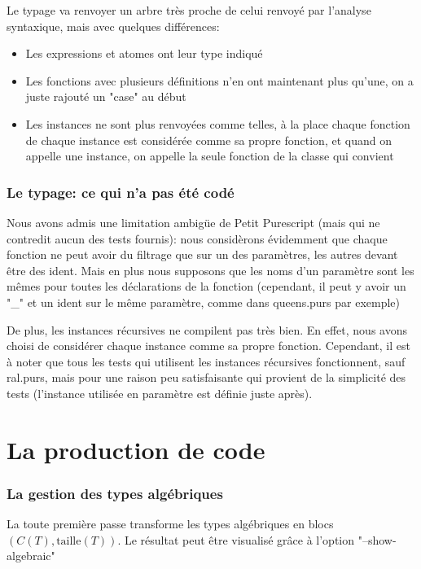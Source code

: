 \documentclass[12pt,a4paper,french]{article}
\begin{document}
Le typage va renvoyer un arbre très proche de celui renvoyé par l'analyse syntaxique, mais avec quelques différences:

\begin{itemize}
	\item Les expressions et atomes ont leur type indiqué
	\item Les fonctions avec plusieurs définitions n'en ont maintenant plus qu'une, on a juste rajouté un "case" au début
	\item Les instances ne sont plus renvoyées comme telles, à la place chaque fonction de chaque instance est considérée comme sa propre fonction, et quand on appelle une instance, on appelle la seule fonction de la classe qui convient
\end{itemize}


\section*{Le typage: ce qui n'a pas été codé}

Nous avons admis une limitation ambigüe de Petit Purescript (mais qui ne contredit aucun des tests fournis): nous considèrons évidemment que chaque fonction ne peut avoir du filtrage
que sur un des paramètres, les autres devant être des ident. Mais en plus nous supposons que les noms d'un paramètre sont les mêmes pour toutes les déclarations de la fonction
(cependant, il peut y avoir un "\_" et un ident sur le même paramètre, comme dans queens.purs par exemple)

De plus, les instances récursives ne compilent pas très bien. En effet, nous avons choisi de considérer chaque instance comme sa propre fonction.
Cependant, il est à noter que tous les tests qui utilisent les instances récursives fonctionnent, sauf ral.purs, mais pour une raison peu satisfaisante
qui provient de la simplicité des tests (l'instance utilisée en paramètre est définie juste après).

\newpage
\part*{La production de code}

\section*{La gestion des types algébriques}
La toute première passe transforme les types algébriques en blocs $(C(T),\text{taille}(T))$. Le résultat peut être visualisé grâce à l'option "--show-algebraic"
\end{document}
